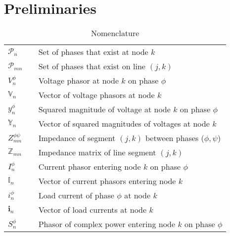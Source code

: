 \section{Preliminaries}


\renewcommand{\arraystretch}{1.15}
\begin{table}[t]
\caption{Nomenclature}
\begin{center}
\begin{tabulary}{\textwidth}{LLL}
	\hline
	\hline
$\mathcal{P}_{n}$ && Set of phases that exist at node $k$ \\
\noindent $\mathcal{P}_{mn}$ & & Set of phases that exist on line $(j,k)$ \\
\noindent $V_{n}^{\phi}$ & & Voltage phasor at node $k$ on phase $\phi$ \\
\noindent $\mathbb{V}_{n}$ & & Vector of voltage phasors at node $k$ \\
\noindent $y_{n}^{\phi}$ & & Squared magnitude of voltage at node $k$ on phase $\phi$ \\ %
\noindent $\mathbb{Y}_{n}$ & & Vector of squared magnitudes of voltages at node $k$ \\
\noindent $Z_{mn}^{\phi \psi}$ & & Impedance of segment $(j,k)$ between phases ($\phi,\psi$) \\
\noindent $\mathbb{Z}_{mn}$ & & Impedance matrix of line segment $(j,k)$ \\
\noindent $I_{n}^{\phi}$ & & Current phasor entering node $k$ on phase $\phi$ \\
\noindent $\mathbb{I}_{n}$ & & Vector of current phasors entering node $k$ \\
\noindent $i_{n}^{\phi}$ & & Load current of phase $\phi$ at node $k$ \\
\noindent $\mathbf{i}_{n}$ & & Vector of load currents at node $k$ \\
\noindent $S_{n}^{\phi}$ & & Phasor of complex power entering node $k$ on phase $\phi$ \\

\end{tabulary}
\end{center}
\end{table}
